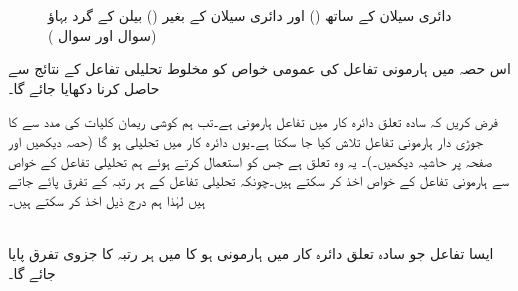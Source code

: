 \begin{figure}
\begin{subfigure}{0.45\textwidth}
\end{subfigure}
\caption{دائری سیلان کے ساتھ () اور دائری سیلان کے بغیر () بیلن کے گرد بہاؤ (سوال  اور سوال )}
\label{شکل_سوال_مخفی_قوہ_بیلن_کے_گرد}
\end{figure}


اس حصہ میں ہارمونی تفاعل کی عمومی خواص کو مخلوط تحلیلی تفاعل کے نتائج سے حاصل کرنا دکھایا جائے گا۔

فرض کریں کہ سادہ تعلق دائرہ کار  میں تفاعل  ہارمونی ہے۔تب ہم کوشی ریمان کلیات کی مدد سے  کا جوڑی دار ہارمونی تفاعل  تلاش کیا جا سکتا ہے۔یوں   دائرہ کار  میں تحلیلی ہو گا (حصہ  دیکھیں اور  صفحہ  پر حاشیہ دیکھیں۔)۔ یہ وہ تعلق ہے جس کو استعمال کرتے ہوئے ہم تحلیلی تفاعل کے خواص سے ہارمونی تفاعل کے خواص اخذ کر سکتے ہیں۔چونکہ تحلیلی تفاعل کے ہر رتبہ کے تفرق پائے جاتے ہیں لہٰذا ہم درج ذیل اخذ کر سکتے ہیں۔

\quad {}\\
 ایسا تفاعل  جو سادہ تعلق دائرہ کار  میں ہارمونی ہو کا   میں ہر رتبہ کا جزوی تفرق پایا جائے گا۔  

